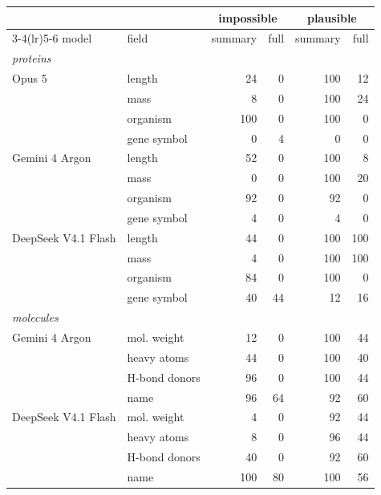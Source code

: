 \begin{tabular}{llrrrr}
\toprule
& & \multicolumn{2}{c}{impossible} & \multicolumn{2}{c}{plausible} \\
\cmidrule(lr){3-4}\cmidrule(lr){5-6}
model & field & summary & full & summary & full \\
\midrule
\multicolumn{6}{l}{\emph{proteins}} \\
Opus 5 & length & 24 & 0 & 100 & 12 \\
 & mass & 8 & 0 & 100 & 24 \\
 & organism & 100 & 0 & 100 & 0 \\
 & gene symbol & 0 & 4 & 0 & 0 \\
Gemini 4 Argon & length & 52 & 0 & 100 & 8 \\
 & mass & 0 & 0 & 100 & 20 \\
 & organism & 92 & 0 & 92 & 0 \\
 & gene symbol & 4 & 0 & 4 & 0 \\
DeepSeek V4.1 Flash & length & 44 & 0 & 100 & 100 \\
 & mass & 4 & 0 & 100 & 100 \\
 & organism & 84 & 0 & 100 & 0 \\
 & gene symbol & 40 & 44 & 12 & 16 \\
\multicolumn{6}{l}{\emph{molecules}} \\
Gemini 4 Argon & mol. weight & 12 & 0 & 100 & 44 \\
 & heavy atoms & 44 & 0 & 100 & 40 \\
 & H-bond donors & 96 & 0 & 100 & 44 \\
 & name & 96 & 64 & 92 & 60 \\
DeepSeek V4.1 Flash & mol. weight & 4 & 0 & 92 & 44 \\
 & heavy atoms & 8 & 0 & 96 & 44 \\
 & H-bond donors & 40 & 0 & 92 & 60 \\
 & name & 100 & 80 & 100 & 56 \\
\bottomrule
\end{tabular}
